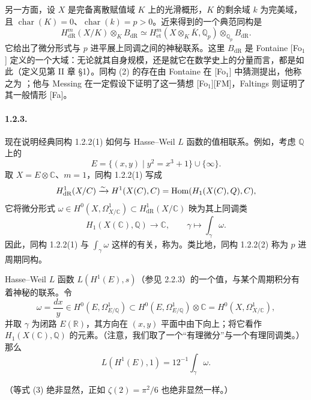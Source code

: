 另一方面，设 $X$ 是完备离散赋值域 $K$ 上的光滑概形，$K$ 的剩余域 $k$ 为完美域，且 $\operatorname{char}(K)=0$、$\operatorname{char}(k)=p>0$。近来得到的一个典范同构是
\[
H^m_{\mathrm{dR}}(X/K)\otimes_KB_{\mathrm{dR}}
\simeq H^m_{\mathrm{\acute et}}(X\otimes_K\overline K,\mathbb Q_p)
\otimes_{\mathbb Q_p}B_{\mathrm{dR}}.\tag{2}
\]
它给出了微分形式与 $p$ 进平展上同调之间的神秘联系。这里 $B_{\mathrm{dR}}$ 是 Fontaine [Fo$_1$] 定义的一个大域：无论就其自身规模，还是就它在数学史上的分量而言，都是如此（定义见第 II 章 §1）。同构 (2) 的存在由 Fontaine 在 [Fo$_1$] 中猜测提出，他称之为 ；他与 Messing 在一定假设下证明了这一猜想 [Fo$_1$][FM]，Faltings 则证明了其一般情形 [Fa]。

\paragraph{1.2.3.}
现在说明经典同构 1.2.2(1) 如何与 Hasse--Weil $L$ 函数的值相联系。例如，考虑 $\mathbb Q$ 上的
\[
E=\{(x,y)\mid y^2=x^3+1\}\cup\{\infty\}.
\]
取 $X=E\otimes\mathbb C$、$m=1$，同构 1.2.2(1) 写成
\[
H^1_{\mathrm{dR}}(X/C)\xrightarrow{\sim}
H^1(X(C),C)
=\operatorname{Hom}(H_1(X(C),Q),C),
\]
它将微分形式 $\omega\in H^0(X,\Omega^1_{X/\mathbb C})\subset H^1_{\mathrm{dR}}(X/\mathbb C)$ 映为其上同调类
\[
H_1(X(\mathbb C),\mathbb Q)\longrightarrow\mathbb C,
\qquad \gamma\longmapsto\int_\gamma\omega.
\]
因此，同构 1.2.2(1) 与 $\int_\gamma\omega$ 这样的有关，称为。类比地，同构 1.2.2(2) 称为 $p$ 进周期同构。

Hasse--Weil $L$ 函数 $L(H^1(E),s)$（参见 2.2.3）的一个值，与某个周期积分有着神秘的联系。令
\[
\omega=\frac{dx}{y}\in H^0(E,\Omega^1_{E/\mathbb Q})
\subset H^0(E,\Omega^1_{E/\mathbb Q})\otimes\mathbb C
=H^0(X,\Omega^1_{X/\mathbb C}),
\]
并取 $\gamma$ 为闭路 $E(\mathbb R)$，其方向在 $(x,y)$ 平面中由下向上；将它看作 $H_1(X(\mathbb C),\mathbb Q)$ 的元素。（注意，我们取了一个“有理微分”与一个有理同调类。）那么
\[
L(H^1(E),1)=12^{-1}\int_\gamma\omega.\tag{3}
\]
\begin{center}
\end{center}
（等式 (3) 绝非显然，正如 $\zeta(2)=\pi^2/6$ 也绝非显然一样。）

